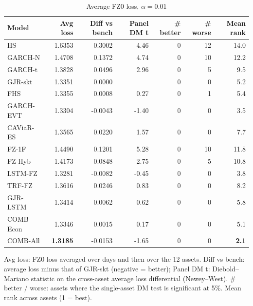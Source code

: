 \begin{table}[htbp]
\centering
\footnotesize
\caption{Average FZ0 loss, $\alpha=0.01$}
\label{tab:loss_a010}
\begin{tabular}{lrrrrrr}
\toprule
Model & Avg loss & Diff vs bench & Panel DM t & \# better & \# worse & Mean rank \\
\midrule
HS & 1.6353 & 0.3002 & 4.46 & 0 & 12 & 14.0 \\
GARCH-N & 1.4708 & 0.1372 & 4.74 & 0 & 10 & 12.2 \\
GARCH-t & 1.3828 & 0.0496 & 2.96 & 0 & 5 & 9.5 \\
GJR-skt & 1.3351 & 0.0000 &  & 0 & 0 & 5.2 \\
FHS & 1.3355 & 0.0008 & 0.27 & 0 & 1 & 5.4 \\
GARCH-EVT & 1.3304 & -0.0043 & -1.40 & 0 & 0 & 3.5 \\
CAViaR-ES & 1.3565 & 0.0220 & 1.57 & 0 & 0 & 7.7 \\
FZ-1F & 1.4490 & 0.1201 & 5.28 & 0 & 10 & 11.8 \\
FZ-Hyb & 1.4173 & 0.0848 & 2.75 & 0 & 5 & 10.8 \\
LSTM-FZ & 1.3281 & -0.0082 & -0.45 & 0 & 0 & 3.8 \\
TRF-FZ & 1.3616 & 0.0246 & 0.83 & 0 & 0 & 8.2 \\
GJR-LSTM & 1.3414 & 0.0062 & 0.62 & 0 & 0 & 5.8 \\
COMB-Econ & 1.3346 & 0.0015 & 0.17 & 0 & 0 & 5.1 \\
COMB-All & \textbf{1.3185} & -0.0153 & -1.65 & 0 & 0 & \textbf{2.1} \\
\bottomrule
\end{tabular}
\par\smallskip\parbox{\linewidth}{\scriptsize Avg loss: FZ0 loss averaged over days and then over the 12 assets. Diff vs bench: average loss minus that of GJR-skt (negative = better); Panel DM t: Diebold--Mariano statistic on the cross-asset average loss differential (Newey--West). \# better / worse: assets where the single-asset DM test is significant at 5\%. Mean rank across assets (1 = best).}
\end{table}
